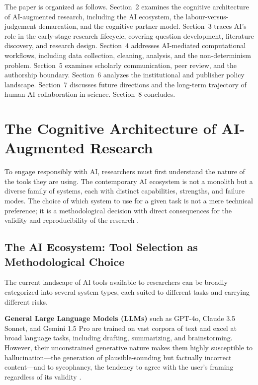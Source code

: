 \documentclass[12pt, a4paper]{article}
\begin{document}
The paper is organized as follows. Section~2 examines the cognitive architecture of AI-augmented research, including the AI ecosystem, the labour-versus-judgement demarcation, and the cognitive partner model. Section~3 traces AI's role in the early-stage research lifecycle, covering question development, literature discovery, and research design. Section~4 addresses AI-mediated computational workflows, including data collection, cleaning, analysis, and the non-determinism problem. Section~5 examines scholarly communication, peer review, and the authorship boundary. Section~6 analyzes the institutional and publisher policy landscape. Section~7 discusses future directions and the long-term trajectory of human-AI collaboration in science. Section~8 concludes.

\section{The Cognitive Architecture of AI-Augmented Research}

To engage responsibly with AI, researchers must first understand the nature of the tools they are using. The contemporary AI ecosystem is not a monolith but a diverse family of systems, each with distinct capabilities, strengths, and failure modes. The choice of which system to use for a given task is not a mere technical preference; it is a methodological decision with direct consequences for the validity and reproducibility of the research \citep{blau2024protecting}.

\subsection{The AI Ecosystem: Tool Selection as Methodological Choice}

The current landscape of AI tools available to researchers can be broadly categorized into several system types, each suited to different tasks and carrying different risks.

\textbf{General Large Language Models (LLMs)} such as GPT-4o, Claude 3.5 Sonnet, and Gemini 1.5 Pro are trained on vast corpora of text and excel at broad language tasks, including drafting, summarizing, and brainstorming. However, their unconstrained generative nature makes them highly susceptible to hallucination---the generation of plausible-sounding but factually incorrect content---and to sycophancy, the tendency to agree with the user's framing regardless of its validity \citep{walters2023fabrication, sharma2026algorithmic}.
\end{document}
